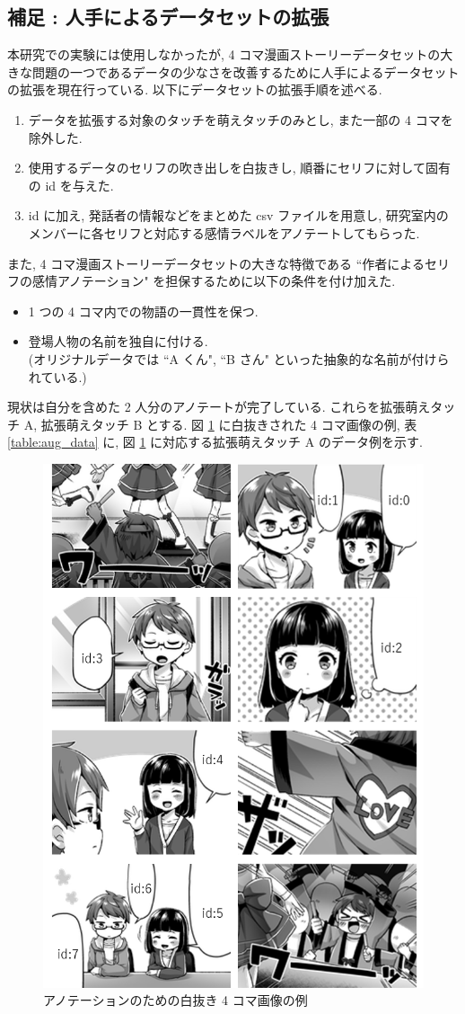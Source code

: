 \changeindent{0cm}
\subsection{補足 : 人手によるデータセットの拡張}
\changeindent{2cm}

本研究での実験には使用しなかったが, 4 コマ漫画ストーリーデータセットの大きな問題の一つであるデータの少なさを改善するために人手によるデータセットの拡張を現在行っている. 以下にデータセットの拡張手順を述べる.

\begin{enumerate}
  \item データを拡張する対象のタッチを萌えタッチのみとし, また一部の 4 コマを除外した.
  \item 使用するデータのセリフの吹き出しを白抜きし, 順番にセリフに対して固有の id を与えた.
  \item id に加え, 発話者の情報などをまとめた csv ファイルを用意し, 研究室内のメンバーに各セリフと対応する感情ラベルをアノテートしてもらった.
\end{enumerate}

また, 4 コマ漫画ストーリーデータセットの大きな特徴である ``作者によるセリフの感情アノテーション" を担保するために以下の条件を付け加えた.

\begin{itemize}
  \item 1 つの 4 コマ内での物語の一貫性を保つ.
  \item 登場人物の名前を独自に付ける. \\ (オリジナルデータでは ``A くん", ``B さん" といった抽象的な名前が付けられている.)
\end{itemize}

現状は自分を含めた 2 人分のアノテートが完了している. これらを拡張萌えタッチ A, 拡張萌えタッチ B とする. 図 \ref{fig:shironuki} に白抜きされた 4 コマ画像の例, 表 \ref{table:aug_data} に, 図 \ref{fig:shironuki} に対応する拡張萌えタッチ A のデータ例を示す.

\newpage
\begin{figure}[!h]
  \vspace{10mm}
  \centering
  \includegraphics[width=0.4\hsize]{doc/figures/shironuki.png}
  \caption{アノテーションのための白抜き 4 コマ画像の例}
  \label{fig:shironuki}
\end{figure}

